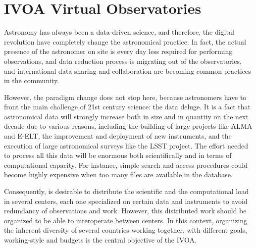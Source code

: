 \section{IVOA Virtual Observatories}
\label{sec:ivoa}

Astronomy has always been a data-driven science, and therefore,
the digital revolution have completely change the astronomical practice.
In fact, the actual presence of the astronomer on site is every
day less required for performing observations, and data reduction process
is migrating out of the observatories, and international data sharing
and collaboration are becoming common practices in the community.

However, the paradigm change 
does not stop here, because astronomers have to front the main challenge of
21st century science: the data deluge. It is a fact that astronomical data will
strongly increase both in size and in quantity on the next decade due to various
reasons, including the building of large projects like ALMA and E-ELT, 
the improvement and deployment of new instruments, and the execution of 
large astronomical surveys like the LSST project.
The effort needed to process all this data will be enormous both
scientifically and in terms of computational capacity. 
For instance, simple search and access procedures could become highly expensive
when too many files are available in the database.

Consequently, is desirable to distribute the scientific and the computational 
load in several centers, each one specialized on certain data and instruments
to avoid redundancy of observations and work. However, this distributed work
should be organized to be able to interoperate between centers.
In this context, organizing the inherent diversity of several countries working together, 
with different goals, working-style and budgets is the central objective of
the IVOA.


